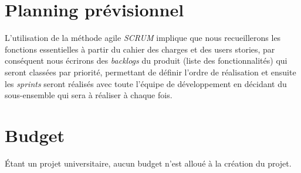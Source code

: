\documentclass[oneside]{report}
\begin{document}
	\chapter{Planning prévisionnel}
	\par L'utilisation de la méthode agile \textit{SCRUM} implique que nous recueillerons les fonctions essentielles à partir du cahier des charges et des users stories, par conséquent nous écrirons des \textit{backlogs} du produit (liste des fonctionnalités) qui seront classées par priorité, permettant de définir l'ordre de réalisation et ensuite les \textit{sprints} seront réalisés avec toute l'équipe de développement en décidant du sous-ensemble qui sera à réaliser à chaque fois.

	\chapter{Budget}
	\par Étant un projet universitaire, aucun budget n'est alloué à la création du projet.
\end{document}
